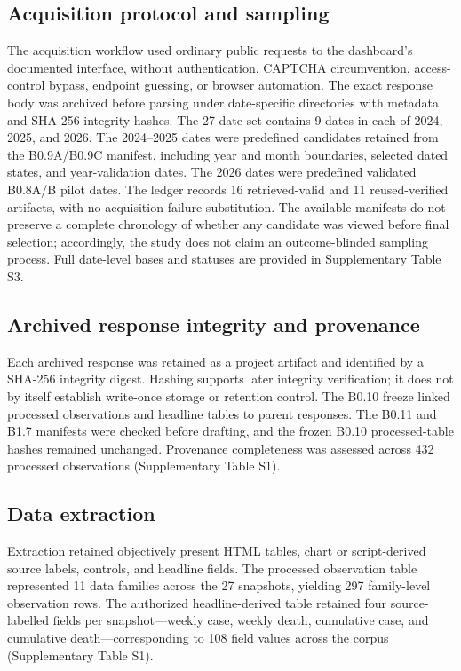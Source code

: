 \subsection{Acquisition protocol and sampling}

The acquisition workflow used ordinary public requests to the dashboard's documented interface, without authentication, CAPTCHA circumvention, access-control bypass, endpoint guessing, or browser automation. The exact response body was archived before parsing under date-specific directories with metadata and SHA-256 integrity hashes. The 27-date set contains 9 dates in each of 2024, 2025, and 2026. The 2024--2025 dates were predefined candidates retained from the B0.9A/B0.9C manifest, including year and month boundaries, selected dated states, and year-validation dates. The 2026 dates were predefined validated B0.8A/B pilot dates. The ledger records 16 retrieved-valid and 11 reused-verified artifacts, with no acquisition failure substitution. The available manifests do not preserve a complete chronology of whether any candidate was viewed before final selection; accordingly, the study does not claim an outcome-blinded sampling process. Full date-level bases and statuses are provided in Supplementary Table S3.

\subsection{Archived response integrity and provenance}

Each archived response was retained as a project artifact and identified by a SHA-256 integrity digest. Hashing supports later integrity verification; it does not by itself establish write-once storage or retention control. The B0.10 freeze linked processed observations and headline tables to parent responses. The B0.11 and B1.7 manifests were checked before drafting, and the frozen B0.10 processed-table hashes remained unchanged. Provenance completeness was assessed across 432 processed observations (Supplementary Table S1).

\subsection{Data extraction}

Extraction retained objectively present HTML tables, chart or script-derived source labels, controls, and headline fields. The processed observation table represented 11 data families across the 27 snapshots, yielding 297 family-level observation rows. The authorized headline-derived table retained four source-labelled fields per snapshot---weekly case, weekly death, cumulative case, and cumulative death---corresponding to 108 field values across the corpus (Supplementary Table S1).

